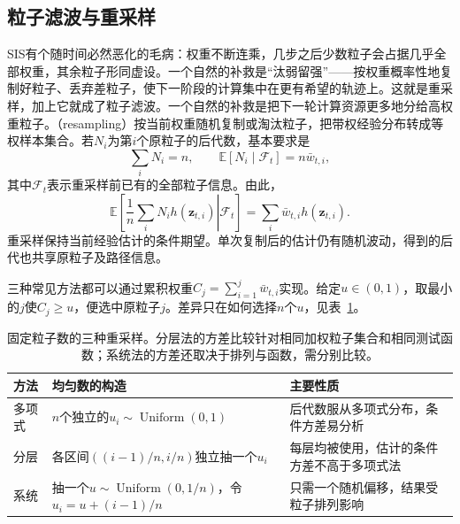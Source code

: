 \subsection{粒子滤波与重采样}
\label{sec:pgm-sampling-particle-filter}

SIS有个随时间必然恶化的毛病：权重不断连乘，几步之后少数粒子会占据几乎全部权重，其余粒子形同虚设。一个自然的补救是“汰弱留强”——按权重概率性地复制好粒子、丢弃差粒子，使下一阶段的计算集中在更有希望的轨迹上。这就是重采样，加上它就成了粒子滤波。一个自然的补救是把下一轮计算资源更多地分给高权重粒子。（resampling）按当前权重随机复制或淘汰粒子，把带权经验分布转成等权样本集合。若$N_i$为第$i$个原粒子的后代数，基本要求是
\begin{equation}
  \sum_i N_i=n,\qquad
  \mathbb{E}[N_i\mid\mathcal{F}_t]=n\bar w_{t,i},
  \label{eq:pgm-sampling-offspring}
\end{equation}
其中$\mathcal{F}_t$表示重采样前已有的全部粒子信息。由此，
\[
  \mathbb{E}\left[
     \left.\frac1n\sum_i N_i h(\bm{z}_{t,i})\right|\mathcal{F}_t
  \right]
    =\sum_i\bar w_{t,i}h(\bm{z}_{t,i}).
\]
重采样保持当前经验估计的条件期望。单次复制后的估计仍有随机波动，得到的后代也共享原粒子及路径信息。

三种常见方法都可以通过累积权重$C_j=\sum_{i=1}^{j}\bar w_{t,i}$实现。给定$u\in(0,1)$，取最小的$j$使$C_j\geq u$，便选中原粒子$j$。差异只在如何选择$n$个$u$，见表~\ref{tab:pgm-sampling-resampling}。

\begin{table}[htbp]
  \centering
  \begin{tabularx}{\linewidth}{@{}lXX@{}}
    \toprule
    方法 & 均匀数的构造 & 主要性质\\
    \midrule
    多项式 & $n$个独立的$u_i\sim\operatorname{Uniform}(0,1)$ & 后代数服从多项式分布，条件方差易分析\\
    分层 & 各区间$((i-1)/n,i/n)$独立抽一个$u_i$ & 每层均被使用，估计的条件方差不高于多项式法\\
    系统 & 抽一个$u\sim\operatorname{Uniform}(0,1/n)$，令$u_i=u+(i-1)/n$ & 只需一个随机偏移，结果受粒子排列影响\\
    \bottomrule
  \end{tabularx}
  \caption{固定粒子数的三种重采样。分层法的方差比较针对相同加权粒子集合和相同测试函数；系统法的方差还取决于排列与函数，需分别比较。}
  \label{tab:pgm-sampling-resampling}
\end{table}

